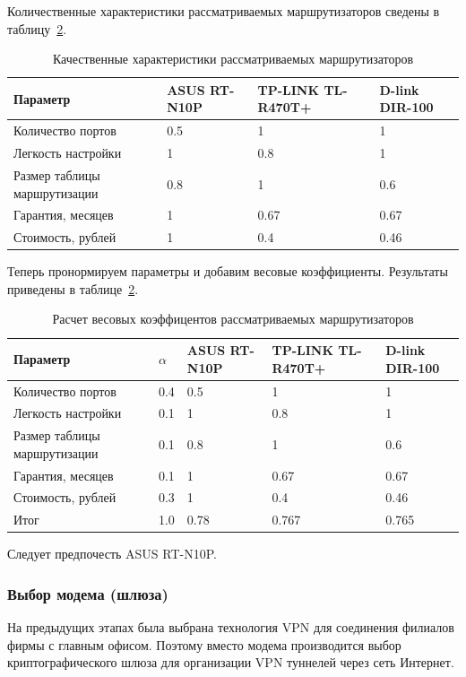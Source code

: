 \documentclass[russian,utf8,emptystyle]{eskdtext}
\begin{document}
Количественные характеристики рассматриваемых маршрутизаторов сведены в таблицу~\ref{tab:routers-2}.

\begin{longtable}{p{7cm}|p{2cm}|p{2cm}|p{2cm}}
\caption{Качественные характеристики рассматриваемых маршрутизаторов}
\label{tab:routers-2} \\
Параметр                     & ASUS RT-N10P & TP-LINK TL-R470T+ & D-link DIR-100 \\ 
\hline 
Количество портов            & 0.5       & 1      & 1  \\ 
Легкость настройки           & 1         & 0.8    & 1  \\ 
Размер таблицы маршрутизации & 0.8       & 1      & 0.6  \\ 
Гарантия, месяцев            & 1         & 0.67   & 0.67  \\ 
Стоимость, рублей            & 1         & 0.4    & 0.46 \\
\end{longtable}

Теперь пронормируем параметры и добавим весовые коэффициенты. Результаты приведены в таблице~\ref{tab:routers-2}.

\begin{longtable}{p{7cm}|p{1cm}|p{2cm}|p{2cm}|p{2cm}}
\caption{Расчет весовых коэффицентов рассматриваемых маршрутизаторов}
\label{tab:routers-2} \\
Параметр                     & $\alpha$ & ASUS RT-N10P & TP-LINK TL-R470T+ & D-link DIR-100 \\ 
\hline 
Количество портов            & 0.4      & 0.5       & 1      & 1  \\ 
Легкость настройки           & 0.1      & 1         & 0.8    & 1  \\ 
Размер таблицы маршрутизации & 0.1      & 0.8       & 1      & 0.6  \\ 
Гарантия, месяцев            & 0.1      & 1         & 0.67   & 0.67  \\ 
Стоимость, рублей            & 0.3      & 1         & 0.4    & 0.46 \\
\hline
Итог                         & 1.0      & 0.78      & 0.767  & 0.765    
\end{longtable}

Следует предпочесть ASUS RT-N10P.

\clearpage
\subsubsection{Выбор модема (шлюза)}
На предыдущих этапах была выбрана технология VPN для соединения филиалов фирмы с главным офисом. Поэтому вместо модема производится выбор криптографического шлюза для организации VPN туннелей через сеть Интернет.
\end{document}
